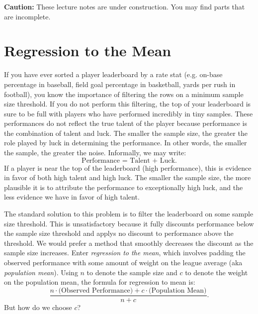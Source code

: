 \documentclass{article}
\begin{document}
\begin{framed}
  {\bf Caution:} These lecture notes are under construction. You may find parts that are incomplete.
\end{framed}

\section{\sc Regression to the Mean}

  If you have ever sorted a player leaderboard by a rate stat (e.g. on-base percentage in baseball, field goal percentage in basketball, yards per rush in football), you know the importance of filtering the rows on a minimum sample size threshold. If you do not perform this filtering, the top of your leaderboard is sure to be full with players who have performed incredibly in tiny samples. These performances do not reflect the true talent of the player because performance is the combination of talent and luck. The smaller the sample size, the greater the role played by luck in determining the performance. In other words, the smaller the sample, the greater the noise. Informally, we may write:
  \begin{equation}
    \label{eqn-talent-plus-luck}
    \mbox{Performance = Talent + Luck}.
  \end{equation}
  If a player is near the top of the leaderboard (high performance), this is evidence in favor of both high talent and high luck. The smaller the sample size, the more plausible it is to attribute the performance to exceptionally high luck, and the less evidence we have in favor of high talent.

  The standard solution to this problem is to filter the leaderboard on some sample size threshold. This is unsatisfactory because it fully discounts performance below the sample size threshold and applys no discount to performance above the threshold. We would prefer a method that smoothly decreases the discount as the sample size increases. Enter {\it regression to the mean}, which involves padding the observed performance with some amount of weight on the league average (aka {\it population mean}). Using $n$ to denote the sample size and $c$ to denote the weight on the population mean, the formula for regression to mean is:
  \begin{equation}
    \label{eqn-regression-to-mean}
    \frac{n \cdot \mbox{(Observed Performance)} + c \cdot \mbox{(Population Mean)}}{n + c}.
  \end{equation}
  But how do we choose $c$?
\end{document}
